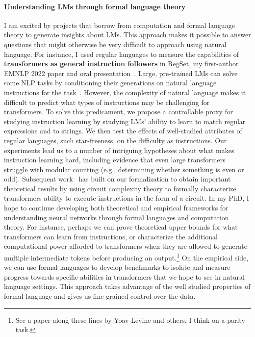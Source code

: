 \documentclass[11pt]{article}
\begin{document}
\paragraph{Understanding LMs through formal language theory}

I am excited by projects 
that borrow from computation and formal language theory
to generate insights about LMs.
This approach makes it possible to answer 
questions that might otherwise be very difficult to approach using natural language.
For instance, I used regular languages
to measure the capabilities of 
\textbf{transformers as general instruction followers}
in RegSet, my first-author EMNLP 2022 paper 
and oral presentation~\cite{Finlayson2022WhatMI}. 
Large, pre-trained LMs can solve some NLP tasks 
by conditioning their generations on natural language instructions 
for the task~\cite{mishra2021crosstask, Wei2021FinetunedLM}. 
However, the complexity of natural language makes it difficult to
predict what types of instructions may be challenging for transformers.
To solve this predicament, 
we propose a controllable proxy for studying instruction learning
by studying LMs' ability to learn to match regular expressions
and to strings.
We then test the effects of well-studied attributes of regular languages,
such star-freeness, on the difficulty as instructions.
Our experiments lead us to a number of intriguing hypotheses 
about what makes instruction learning hard, 
including evidence that even large transformers struggle with modular counting 
(e.g., determining whether something is even or odd). 
Subsequent work~\cite{Merrill2022LogPrecisionTA} 
has built on our formalization 
to obtain important theoretical results
by using circuit complexity theory
to formally characterize transformers ability to execute instructions in the form of a circuit.
In my PhD, I hope to continue developing both theoretical and empirical frameworks 
for understanding neural networks through formal languages and computation theory.
For instance, perhaps we can prove theoretical upper bounds 
for what transformers can learn from instructions,
or characterize the additional computational power 
afforded to transformers 
when they are allowed to generate multiple intermediate tokens 
before producing an output.\footnote{
  See a paper along these lines by Yoav Levine and others, I think on a parity task.
}
On the empirical side, we can use formal languages to develop benchmarks 
to isolate and measure progress towards specific abilities 
in transformers that we hope to see in natural language settings.
This approach takes advantage of the well studied properties of formal language
and gives us fine-grained control over the data.
\end{document}
